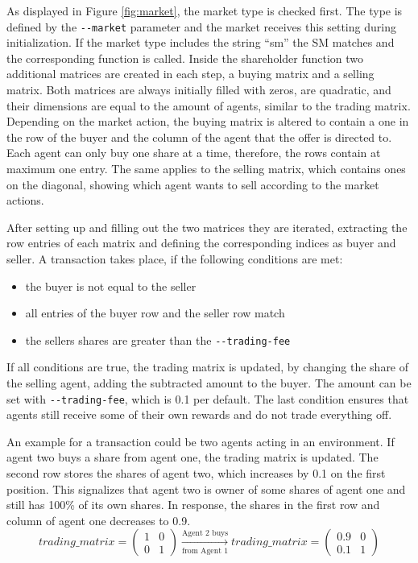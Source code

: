 As displayed in Figure \ref{fig:market}, the market type is checked first. The type is defined by the \verb|--market| parameter and the market receives this setting during initialization. If the market type includes the string ``sm'' the SM matches and the corresponding function is called. Inside the shareholder function two additional matrices are created in each step, a buying matrix and a selling matrix. Both matrices are always initially filled with zeros, are quadratic, and their dimensions are equal to the amount of agents, similar to the trading matrix. Depending on the market action, the buying matrix is altered to contain a one in the row of the buyer and the column of the agent that the offer is directed to. Each agent can only buy one share at a time, therefore, the rows contain at maximum one entry. The same applies to the selling matrix, which contains ones on the diagonal, showing which agent wants to sell according to the market actions.

After setting up and filling out the two matrices they are iterated, extracting the row entries of each matrix and defining the corresponding indices as buyer and seller. A transaction takes place, if the following conditions are met:
\begin{itemize}
    \item the buyer is not equal to the seller
    \item all entries of the buyer row and the seller row match
    \item the sellers shares are greater than the \verb|--trading-fee|
\end{itemize}

If all conditions are true, the trading matrix is updated, by changing the share of the selling agent, adding the subtracted amount to the buyer. The amount can be set with \verb|--trading-fee|, which is 0.1 per default. The last condition ensures that agents still receive some of their own rewards and do not trade everything off. 

An example for a transaction could be two agents acting in an environment. If agent two buys a share from agent one, the trading matrix is updated. The second row stores the shares of agent two, which increases by 0.1 on the first position. This signalizes that agent two is owner of some shares of agent one and still has 100\% of its own shares. In response, the shares in the first row and column of agent one decreases to 0.9.
\begin{equation*}
trading\_matrix = 
\begin{pmatrix}
1 & 0 \\
0 & 1
\end{pmatrix} \xrightarrow[\text{from Agent 1}]{\text{Agent 2 buys}} 
trading\_matrix = 
\begin{pmatrix}
0.9 & 0 \\
0.1 & 1
\end{pmatrix} 
\end{equation*}

